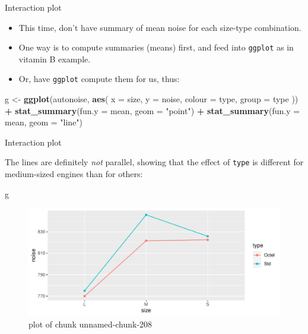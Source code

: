 \documentclass[ignorenonframetext,]{beamer}
\newenvironment{Shaded}{\begin{snugshade}}{\end{snugshade}}
\newcommand{\DataTypeTok}[1]{\textcolor[rgb]{0.13,0.29,0.53}{#1}}
\newcommand{\KeywordTok}[1]{\textcolor[rgb]{0.13,0.29,0.53}{\textbf{#1}}}
\newcommand{\NormalTok}[1]{#1}
\newcommand{\OperatorTok}[1]{\textcolor[rgb]{0.81,0.36,0.00}{\textbf{#1}}}
\newcommand{\StringTok}[1]{\textcolor[rgb]{0.31,0.60,0.02}{#1}}
\begin{document}
\begin{frame}[fragile]{Interaction plot}
\protect\hypertarget{interaction-plot-1}{}

\begin{itemize}
\item
  This time, don't have summary of mean noise for each size-type
  combination.
\item
  One way is to compute summaries (means) first, and feed into
  \texttt{ggplot} as in vitamin B example.
\item
  Or, have \texttt{ggplot} compute them for us, thus:
\end{itemize}

\begin{Shaded}
\begin{Highlighting}[]
\NormalTok{g <-}\StringTok{ }\KeywordTok{ggplot}\NormalTok{(autonoise, }\KeywordTok{aes}\NormalTok{(}
  \DataTypeTok{x =}\NormalTok{ size, }\DataTypeTok{y =}\NormalTok{ noise,}
  \DataTypeTok{colour =}\NormalTok{ type, }\DataTypeTok{group =}\NormalTok{ type}
\NormalTok{)) }\OperatorTok{+}
\StringTok{  }\KeywordTok{stat_summary}\NormalTok{(}\DataTypeTok{fun.y =}\NormalTok{ mean, }\DataTypeTok{geom =} \StringTok{"point"}\NormalTok{) }\OperatorTok{+}
\StringTok{  }\KeywordTok{stat_summary}\NormalTok{(}\DataTypeTok{fun.y =}\NormalTok{ mean, }\DataTypeTok{geom =} \StringTok{"line"}\NormalTok{)}
\end{Highlighting}
\end{Shaded}

\end{frame}

\begin{frame}[fragile]{Interaction plot}
\protect\hypertarget{interaction-plot-2}{}

The lines are definitely \emph{not} parallel, showing that the effect of
\texttt{type} is different for medium-sized engines than for others:

\begin{Shaded}
\begin{Highlighting}[]
\NormalTok{g}
\end{Highlighting}
\end{Shaded}

\begin{figure}
\centering
\includegraphics{figure/unnamed-chunk-208-1.pdf}
\caption{plot of chunk unnamed-chunk-208}
\end{figure}

\end{frame}
\end{document}

